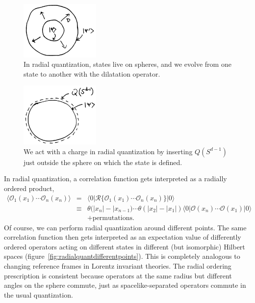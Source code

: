 \documentclass[11pt]{ws-rv9x6}
\newcommand\be{\begin{eqnarray}}
\newcommand\ee{\end{eqnarray}}
\newcommand\cO{\mathcal{O}}
\newcommand\<\langle
\renewcommand\>\rangle
\newcommand\nn{\nonumber}
\renewcommand\.{\cdot}
\begin{document}
\begin{figure}
\begin{center}
\includegraphics[width=0.35\textwidth]{radialquantization.jpg}
\end{center}
\caption{In radial quantization, states live on spheres, and we evolve from one state to another with the dilatation operator. \label{fig:radialquantization}}
\end{figure}

\begin{figure}
\begin{center}
\includegraphics[width=0.35\textwidth]{chargeactionradialquantization.jpg}
\end{center}
\caption{We act with a charge in radial quantization by inserting $Q(S^{d-1})$ just outside the sphere on which the state is defined. \label{fig:chargeactionradialquantization}}
\end{figure}

In radial quantization, a correlation function gets interpreted as a radially ordered product,
\be
\<\cO_1(x_1)\cdots \cO_n(x_n)\> &=& \<0|\mathcal{R}\{ \cO_1(x_1)\cdots \cO_n(x_n)\}|0\>\nn\\
&\equiv & \theta(|x_n|-|x_{n-1})\cdots \theta(|x_2|-|x_1|) \<0|\cO(x_n)\cdots\cO(x_1)|0\>\nn\\
&&+\mathrm{permutations}.
\ee
Of course, we can perform radial quantization around different points.  The same correlation function then gets interpreted as an expectation value of differently ordered operators acting on different states in different (but isomorphic) Hilbert spaces (figure~\ref{fig:radialquantdifferentpoints}).  This is completely analogous to changing reference frames in Lorentz invariant theories.  The radial ordering prescription is consistent because operators at the same radius but different angles on the sphere commute, just as spacelike-separated operators commute in the usual quantization.
\end{document}
